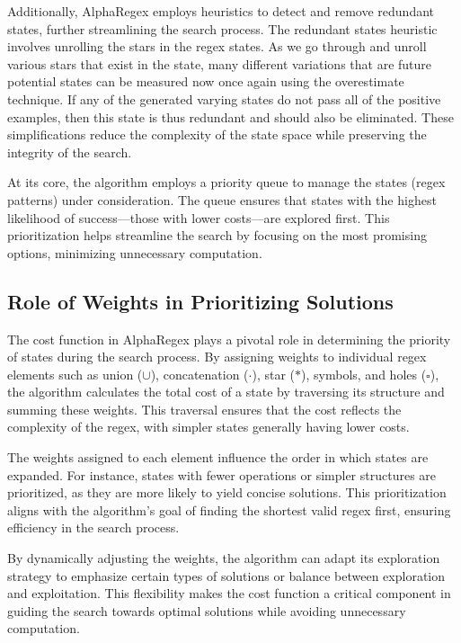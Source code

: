\indent \indent Additionally, AlphaRegex employs heuristics to detect and remove redundant states, further streamlining the search process. The redundant states heuristic involves unrolling the stars in the regex states. As we go through and unroll various stars that exist in the state, many different variations that are future potential states can be measured now once again using the overestimate technique. If any of the generated varying states do not pass all of the positive examples, then this state is thus redundant and should also be eliminated. These simplifications reduce the complexity of the state space while preserving the integrity of the search.

\indent\indent At its core, the algorithm employs a priority queue to manage the states (regex patterns) under consideration. The queue ensures that states with the highest likelihood of success---those with lower costs---are explored first. This prioritization helps streamline the search by focusing on the most promising options, minimizing unnecessary computation.

\subsection{Role of Weights in Prioritizing Solutions}
\indent\indent The cost function in AlphaRegex plays a pivotal role in determining the priority of states during the search process. By assigning weights to individual regex elements such as union (\( \cup \)), concatenation (\( \cdot \)), star (\( * \)), symbols, and holes (\( \square \)), the algorithm calculates the total cost of a state by traversing its structure and summing these weights. This traversal ensures that the cost reflects the complexity of the regex, with simpler states generally having lower costs.

\indent\indent The weights assigned to each element influence the order in which states are expanded. For instance, states with fewer operations or simpler structures are prioritized, as they are more likely to yield concise solutions. This prioritization aligns with the algorithm's goal of finding the shortest valid regex first, ensuring efficiency in the search process.

\indent\indent By dynamically adjusting the weights, the algorithm can adapt its exploration strategy to emphasize certain types of solutions or balance between exploration and exploitation. This flexibility makes the cost function a critical component in guiding the search towards optimal solutions while avoiding unnecessary computation.

